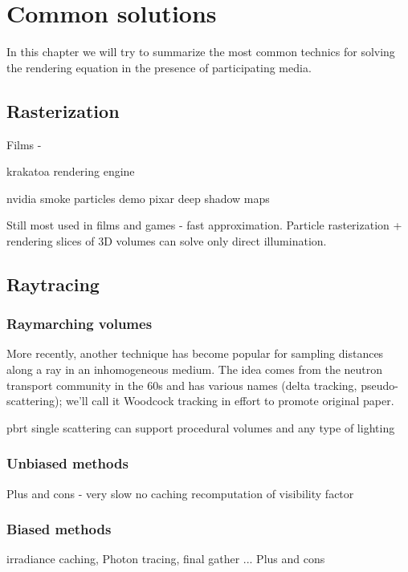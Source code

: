 \chapter{Common solutions}
In this chapter we will try to summarize the most common technics for solving the rendering equation in the presence of participating media.

\section{ Rasterization}
Films - 

krakatoa rendering engine

nvidia smoke particles demo 
pixar deep shadow maps \cite{LokDSM}

Still most used in films and games - fast approximation.
Particle rasterization + rendering slices of 3D volumes can solve only direct illumination.
\section{Raytracing}
\subsection{Raymarching volumes}
More recently, another technique has become popular for sampling distances along a ray in an inhomogeneous medium. The idea comes from the neutron transport community in the 60s and has various names (delta tracking, pseudo-scattering); we’ll call it Woodcock tracking in effort to promote original paper.


pbrt single scattering
can support procedural volumes and any type of lighting
\subsection{Unbiased methods}
Plus and cons - very slow no caching recomputation of visibility factor
\subsection{Biased methods}
\cite{jarosz08thesis} %
irradiance caching, Photon tracing, final gather ...
Plus and cons

